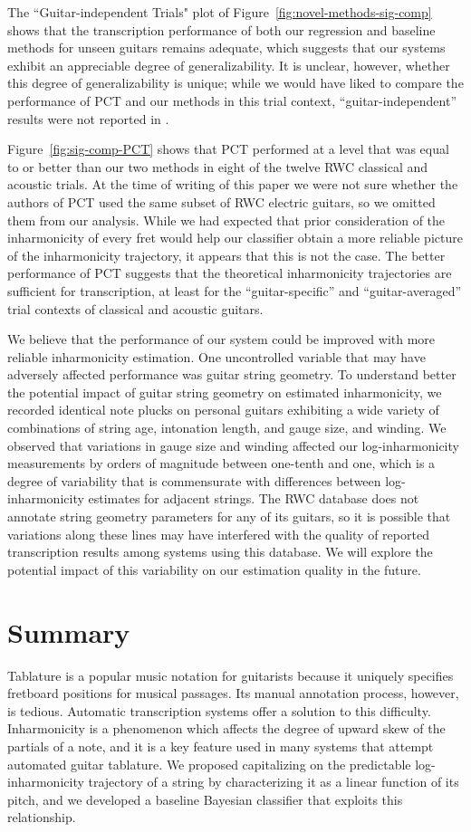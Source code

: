 \documentclass[convention,peer-reviewed]{aesconf}
\begin{document}
The ``Guitar-independent Trials" plot of Figure~\ref{fig:novel-methods-sig-comp} shows that the transcription performance of both our regression and baseline methods for unseen guitars remains adequate, which suggests that our systems exhibit an appreciable degree of generalizability. It is unclear, however, whether this degree of generalizability is unique; while we would have liked to compare the performance of PCT and our methods in this trial context, ``guitar-independent'' results were not reported in \citep{barbanchoi2012}.

Figure~\ref{fig:sig-comp-PCT} shows that PCT performed at a level that was equal to or better than  our two methods in eight of the twelve RWC classical and acoustic trials. At the time of writing of this paper we were not sure whether the authors of PCT used the same subset of RWC electric guitars, so we omitted them from our analysis. While we had expected that prior consideration of the inharmonicity of every fret would help our classifier obtain a more reliable picture of the inharmonicity trajectory, it appears that this is not the case. The better performance of PCT suggests that the theoretical inharmonicity trajectories are sufficient for transcription, at least for the ``guitar-specific'' and ``guitar-averaged'' trial contexts of classical and acoustic guitars. 

We believe that the performance of our system could be improved with more reliable inharmonicity estimation. One uncontrolled variable that may have adversely affected performance was guitar string geometry. To understand better the potential impact of guitar string geometry on estimated inharmonicity, we recorded identical note plucks on personal guitars exhibiting a wide variety of combinations of string age, intonation length, and gauge size, and winding.  We observed that variations in gauge size and winding affected our log-inharmonicity measurements by orders of magnitude between one-tenth and one, which is a degree of variability that is commensurate with differences  between log-inharmonicity estimates for adjacent strings. The RWC database does not annotate string geometry parameters for any of its guitars, so it is possible that variations along these lines may have  interfered with the quality of reported transcription results among systems using this database.   We will explore the potential impact of this variability on our estimation quality in the future.

\section{Summary} 
Tablature is a popular music notation for guitarists because it uniquely specifies fretboard positions for musical passages. Its manual annotation process, however, is tedious. Automatic transcription systems offer a solution to this difficulty. Inharmonicity is a phenomenon which affects the degree of upward skew of the partials of a note, and it is a key feature used in many systems that attempt automated guitar tablature. We proposed capitalizing on the predictable log-inharmonicity trajectory of a string by characterizing it as a linear function of its pitch, and we developed a baseline Bayesian classifier that exploits this relationship. 
\end{document}
